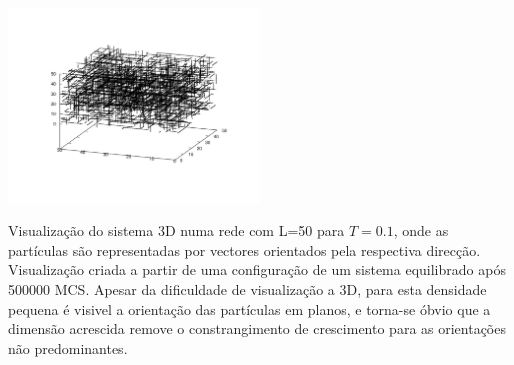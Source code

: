 \documentclass[a4paper,10pt]{article}
\makeatletter
\newenvironment{figurehere}
  {\def\@captype{figure}}
  {}
\makeatother
\begin{document}
\begin{multicols}{2}
\begin{figurehere}
	\centering
		\includegraphics[width=0.5\textwidth, clip, trim = 2.7cm 2.5cm 2cm 2cm]{images/rods3d}
	\caption{{\footnotesize Visualização do sistema 3D numa rede com L=50 para $T=0.1$, onde as partículas são representadas por vectores orientados pela respectiva direcção. Visualização criada a partir de uma configuração de um sistema equilibrado após 500000 MCS. Apesar da dificuldade de visualização a 3D, para esta densidade pequena é visivel a orientação das partículas em planos, e torna-se óbvio que a dimensão acrescida remove o constrangimento de crescimento para as orientações não predominantes.}}     
	\label{fig:21}
\end{figurehere}




\end{multicols}
\end{document}
